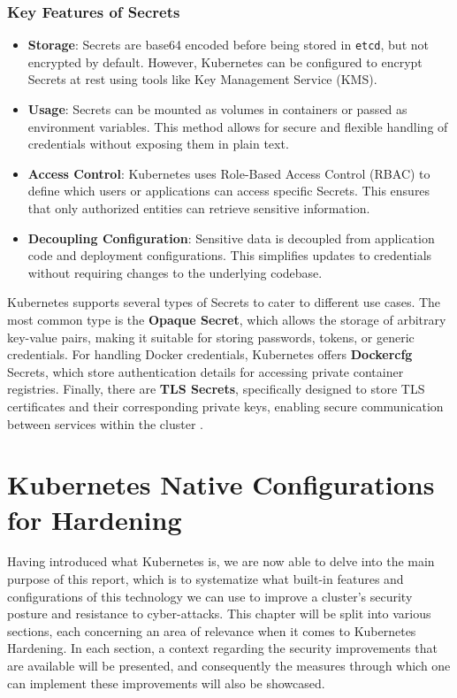 \documentclass[a4paper,11pt,openright,BCOR=15mm]{scrbook}
\begin{document}
\subsection{Key Features of Secrets}
\begin{itemize}
	\item \textbf{Storage}: Secrets are base64 encoded before being stored in \texttt{etcd}, but not encrypted by default. However, Kubernetes can be configured to encrypt Secrets at rest using tools like Key Management Service (KMS).
	\item \textbf{Usage}: Secrets can be mounted as volumes in containers or passed as environment variables. This method allows for secure and flexible handling of credentials without exposing them in plain text.
	\item \textbf{Access Control}: Kubernetes uses Role-Based Access Control (RBAC) to define which users or applications can access specific Secrets. This ensures that only authorized entities can retrieve sensitive information.
	\item \textbf{Decoupling Configuration}: Sensitive data is decoupled from application code and deployment configurations. This simplifies updates to credentials without requiring changes to the underlying codebase.
\end{itemize}

Kubernetes supports several types of Secrets to cater to different use cases. The most common type is the \textbf{Opaque Secret}, which allows the storage of arbitrary key-value pairs, making it suitable for storing passwords, tokens, or generic credentials. For handling Docker credentials, Kubernetes offers \textbf{Dockercfg} Secrets, which store authentication details for accessing private container registries. Finally, there are \textbf{TLS Secrets}, specifically designed to store TLS certificates and their corresponding private keys, enabling secure communication between services within the cluster \cite{the_linux_foundation_secrets_2024}.
		
\chapter{Kubernetes Native Configurations for Hardening}
Having introduced what Kubernetes is, we are now able to delve into the main purpose of this report, which is to systematize what built-in features and configurations of this technology we can use to improve a cluster's security posture and resistance to cyber-attacks.
This chapter will be split into various sections, each concerning an area of relevance when it comes to Kubernetes Hardening. In each section, a context regarding the security improvements that are available will be presented, and consequently the measures through which one can implement these improvements will also be showcased.
\end{document}
